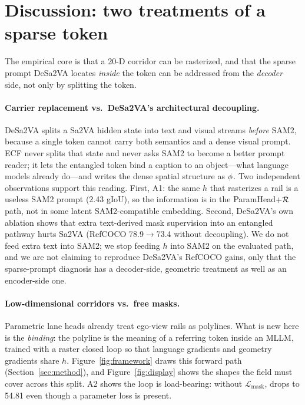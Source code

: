 \section{Discussion: two treatments of a sparse \Seg{} token}
\label{sec:discussion}

The empirical core is that a 20-D corridor can be rasterized, and that the sparse \Seg{} prompt DeSa2VA locates \emph{inside} the token can be addressed from the \emph{decoder} side, not only by splitting the token.

\paragraph{Carrier replacement vs.\ DeSa2VA's architectural decoupling.}
DeSa2VA \citep{dang2025desa2va} splits a Sa2VA hidden state into text and visual streams \emph{before} SAM2, because a single \Seg{} token cannot carry both semantics and a dense visual prompt.
ECF never splits that state and never asks SAM2 to become a better prompt reader; it lets the entangled token bind a caption to an object---what language models already do---and writes the dense spatial structure as $\phi$.
Two independent observations support this reading.
First, A1: the same $h$ that rasterizes a rail is a useless SAM2 prompt (2.43 gIoU), so the information is in the ParamHead$+\mathcal{R}$ path, not in some latent SAM2-compatible embedding.
Second, DeSa2VA's own ablation shows that extra text-derived mask supervision into an entangled \Seg{} pathway hurts Sa2VA (RefCOCO 78.9$\to$73.4 without decoupling).
We do not feed extra text into SAM2; we stop feeding $h$ into SAM2 on the evaluated path, and we are not claiming to reproduce DeSa2VA's RefCOCO gains, only that the sparse-prompt diagnosis has a decoder-side, geometric treatment as well as an encoder-side one.

\paragraph{Low-dimensional corridors vs.\ free masks.}
Parametric lane heads \citep{tabelini2021polylanenet,feng2022bezierlanenet} already treat ego-view rails as polylines.
What is new here is the \emph{binding}: the polyline is the meaning of a referring \Seg{} token inside an MLLM, trained with a raster closed loop so that language gradients and geometry gradients share $h$.
Figure~\ref{fig:framework} draws this forward path (Section~\ref{sec:method}), and Figure~\ref{fig:display} shows the shapes the field must cover across this split.
A2 shows the loop is load-bearing: without $\mathcal{L}_{\mathrm{mask}}$,  drops to 54.81 even though a parameter loss is present.

